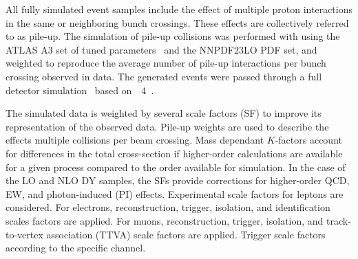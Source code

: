 All fully simulated event samples include the effect of multiple proton interactions in the same or neighboring bunch crossings.
These effects are collectively referred to as pile-up.
The simulation of pile-up collisions was performed with  using the ATLAS A3 set of tuned parameters~\cite{ATL-PHYS-PUB-2016-017} and the NNPDF23LO PDF set, and weighted to reproduce the average number of pile-up interactions per bunch crossing observed in data.
The generated events were passed through a full detector simulation~\cite{SOFT-2010-01} based on\ \GEANT~4~\cite{geant}.

The simulated data is weighted by several scale factors (SF) to improve its representation of the observed data.
Pile-up weights are used to describe the effects multiple collisions per beam crossing.
Mass dependant $K$-factors account for differences in the total cross-section if higher-order calculations are available for a given process compared to the order available for simulation. In the case of the LO and NLO DY samples, the SFs provide corrections for higher-order QCD, EW, and photon-induced (PI) effects.
Experimental scale factors for leptons are considered. For electrons, reconstruction, trigger, isolation, and identification scales factors are applied. For muons, reconstruction, trigger, isolation, and track-to-vertex association (TTVA) scale factors are applied.
Trigger scale factors according to the specific channel.


